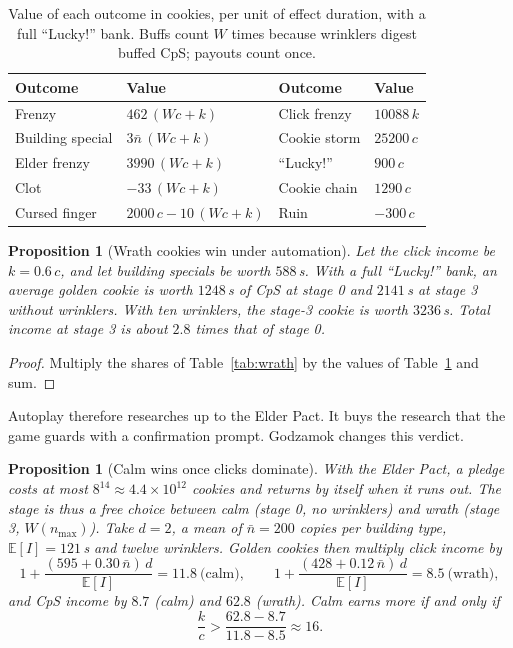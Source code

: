 \documentclass[11pt,a4paper]{article}
\numberwithin{equation}{section}
\newtheorem{proposition}[theorem]{Proposition}
\theoremstyle{definition}
\theoremstyle{remark}
\newcommand{\E}{\mathbb E}
\newcommand{\Lucky}{\textup{``Lucky!''}}
\begin{document}
\begin{table}[t]
\centering
\small
\begin{tabular}{@{}ll@{\qquad}ll@{}}
\toprule
Outcome & Value & Outcome & Value \\
\midrule
Frenzy & $462\,(Wc+k)$ & Click frenzy & $10088\,k$ \\
Building special & $3\bar n\,(Wc+k)$ & Cookie storm & $25200\,c$ \\
Elder frenzy & $3990\,(Wc+k)$ & \Lucky{} & $900\,c$ \\
Clot & $-33\,(Wc+k)$ & Cookie chain & $1290\,c$ \\
Cursed finger & $2000\,c-10\,(Wc+k)$ & Ruin & $-300\,c$ \\
\bottomrule
\end{tabular}
\caption{Value of each outcome in cookies, per unit of effect duration, with a full \Lucky{} bank. Buffs count $W$ times because wrinklers digest buffed CpS; payouts count once.}
\label{tab:effects}
\end{table}

\begin{proposition}[Wrath cookies win under automation]\label{prop:wrath}
Let the click income be $k=0.6\,c$, and let building specials be worth $588$\,s. With a full \Lucky{} bank, an average golden cookie is worth $1248$\,s of CpS at stage 0 and $2141$\,s at stage 3 without wrinklers. With ten wrinklers, the stage-3 cookie is worth $3236$\,s. Total income at stage 3 is about $2.8$ times that of stage 0.
\end{proposition}

\begin{proof}
Multiply the shares of Table~\ref{tab:wrath} by the values of Table~\ref{tab:effects} and sum.
\end{proof}

Autoplay therefore researches up to the Elder Pact. It buys the research that the game guards with a confirmation prompt. Godzamok changes this verdict.

\begin{proposition}[Calm wins once clicks dominate]\label{prop:calm}
With the Elder Pact, a pledge costs at most $8^{14}\approx4.4\times10^{12}$ cookies and returns by itself when it runs out. The stage is thus a free choice between calm (stage 0, no wrinklers) and wrath (stage 3, $W(n_{\max})$). Take $d=2$, a mean of $\bar n=200$ copies per building type, $\E[I]=121$\,s and twelve wrinklers. Golden cookies then multiply click income by
\begin{equation}\label{eq:calm-clicks}
 1+\frac{(595+0.30\,\bar n)\,d}{\E[I]}=11.8\ \text{(calm)},\qquad 1+\frac{(428+0.12\,\bar n)\,d}{\E[I]}=8.5\ \text{(wrath)},
\end{equation}
and CpS income by $8.7$ (calm) and $62.8$ (wrath). Calm earns more if and only if
\begin{equation}\label{eq:calm-threshold}
 \frac kc>\frac{62.8-8.7}{11.8-8.5}\approx16.
\end{equation}
\end{proposition}
\end{document}
